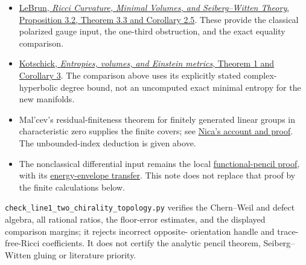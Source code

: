 \documentclass[
  11pt,
]{article}
\providecommand{\tightlist}{%
  \setlength{\itemsep}{0pt}\setlength{\parskip}{0pt}}
\begin{document}
\begin{itemize}
\tightlist
\item
  \href{https://arxiv.org/html/math/0003068}{LeBrun, \emph{Ricci
  Curvature, Minimal Volumes, and Seiberg--Witten Theory}, Proposition
  3.2, Theorem 3.3 and Corollary 2.5}. These provide the classical
  polarized gauge input, the one-third obstruction, and the exact
  equality comparison.
\item
  \href{https://arxiv.org/html/math/0410215}{Kotschick, \emph{Entropies,
  volumes, and Einstein metrics}, Theorem 1 and Corollary 3}. The
  comparison above uses its explicitly stated complex-hyperbolic degree
  bound, not an uncomputed exact minimal entropy for the new manifolds.
\item
  Mal'cev's residual-finiteness theorem for finitely generated linear
  groups in characteristic zero supplies the finite covers; see
  \href{https://arxiv.org/abs/1306.2385}{Nica's account and proof}. The
  unbounded-index deduction is given above.
\item
  The nonclassical differential input remains the local
  \href{line1_functional_pencil.md}{functional-pencil proof}, with its
  \href{line1_energy_envelope_gap.md}{energy-envelope transfer}. This
  note does not replace that proof by the finite calculations below.
\end{itemize}

\texttt{check\_line1\_two\_chirality\_topology.py} verifies the
Chern--Weil and defect algebra, all rational ratios, the floor-error
estimates, and the displayed comparison margins; it rejects incorrect
opposite- orientation handle and trace-free-Ricci coefficients. It does
not certify the analytic pencil theorem, Seiberg--Witten gluing or
literature priority.
\end{document}
